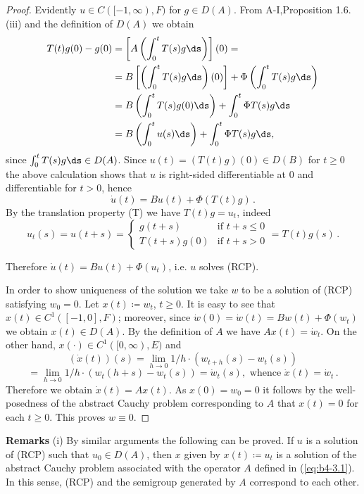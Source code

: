 \begin{proof} Evidently $u \in C([-1,\infty),F)$ for $g \in D(A)$.
From A-I,Proposition 1.6.(iii) and the definition of $D(A)$ we obtain
\begin{align*}
	T(t)g(0) - g(0) &= \left[A\left(\int_{0}^{t} T(s)g  \ds \right)\right](0) = \\
	&= B\left[\left(\int_{0}^{t} T(s)g \ds\right)(0)\right] + \Phi\left(\int_{0}^{t} T(s)g \ds \right) \\
	&= B\left(\int_{0}^{t} T(s)g(0) \ds\right) + \int_{0}^{t} \Phi T(s)g \ds  \\
	&= B\left(\int_{0}^{t} u(s) \ds\right)  + \int_{0}^{t} \Phi T(s)g \ds ,
\end{align*}
since $\int_{0}^{t} T(s)g \ds  \in D(A)$.
%
%
%
%
\newpage
%
%
Since $u(t) = (T(t)g)(0) \in D(B)$ for $t \geq 0$ the above calculation shows that $u$ is right-sided differentiable at $0$ and differentiable for $t > 0$, hence
\[
\dot{u}(t) = Bu(t) + \Phi(T(t)g)\,.
\]
By the translation property (T) we have $T(t)g = u_t$, indeed
\[
u_t(s) = u(t+s) = 
\begin{cases}
	g(t+s) & \text{if } t+s \leq 0 \\
	T(t+s)g(0) & \text{if } t+s > 0
\end{cases}
= T(t)g(s)\,.
\]

Therefore $\dot{u}(t) = Bu(t) + \Phi(u_t)$, i.e. $u$ solves (RCP).

In order to show uniqueness of the solution we take $w$ to be a solution of (RCP) satisfying $w_{0} = 0$. Let $x(t) \coloneq  w_t$, $t \geq 0$. It is easy to see that $x(t) \in C^1([-1,0],F)$; moreover, since $\dot{w}(0) = \dot{w}(t) = Bw(t) + \Phi(w_t)$ we obtain $x(t) \in D(A)$. By the definition of $A$ we have $Ax(t) = \dot{w}_t$. On the other hand, $x(\cdot) \in C^1([0,\infty),E)$ and
\[
(\dot{x}(t))(s) = \lim_{h \to 0} 1/h \cdot (w_{t+h}(s) - w_t(s))
\]
\[
= \lim_{h \to 0} 1/h \cdot (w_t(h+s) - w_t(s)) = \dot{w}_t(s), \text{ whence } \dot{x}(t) = \dot{w}_t\,.
\]
Therefore we obtain $\dot{x}(t) = Ax(t)$. As $x(0) = w_{0} = 0$ it follows by the well-posedness of the abstract Cauchy problem corresponding to $A$ that $x(t) = 0$ for each $t \geq 0$. This proves $w \equiv 0$.
\end{proof}

\noindent
\textbf{Remarks}\quad 
(i) By similar arguments the following can be proved. If $u$ is a solution of (RCP) such that $u_{0} \in D(A)$, then $x$ given by $x(t) \coloneq  u_t$ is a solution of the abstract Cauchy problem associated with the operator $A$ defined in (\ref{eq:b4-3.1}). In this sense, (RCP) and the semigroup generated by $A$ correspond to each other.

